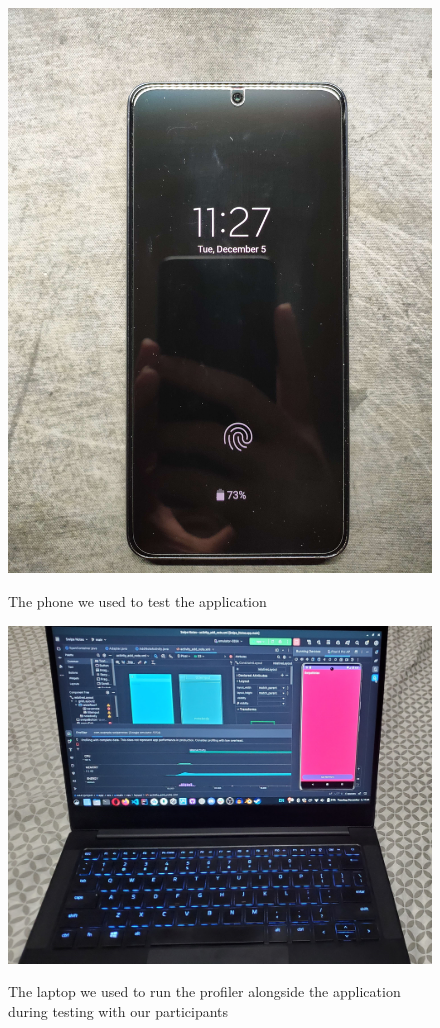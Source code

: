 \documentclass[conference]{IEEEtran}
\begin{document}
\begin{figure}[ht]
    \centering
    \includegraphics[scale=0.075]{images/s21front.jpg}\\
    \caption{The phone we used to test the application}
    \label{fig:enter-label}
\end{figure}

\begin{figure}[ht]
    \centering
    \includegraphics[scale=0.11]{images/laptop.jpg}\\
    \caption{The laptop we used to run the profiler alongside the application during testing with our participants}
    \label{fig:enter-label}
\end{figure}
\end{document}
